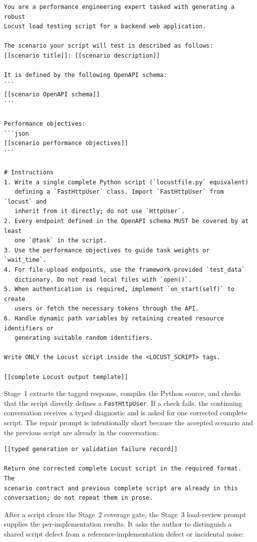 \small
\begin{verbatim}
You are a performance engineering expert tasked with generating a robust
Locust load testing script for a backend web application.

The scenario your script will test is described as follows:
[[scenario title]]: [[scenario description]]

It is defined by the following OpenAPI schema:
```
[[scenario OpenAPI schema]]
```

Performance objectives:
```json
[[scenario performance objectives]]
```

# Instructions
1. Write a single complete Python script (`locustfile.py` equivalent)
   defining a `FastHttpUser` class. Import `FastHttpUser` from `locust` and
   inherit from it directly; do not use `HttpUser`.
2. Every endpoint defined in the OpenAPI schema MUST be covered by at least
   one `@task` in the script.
3. Use the performance objectives to guide task weights or `wait_time`.
4. For file-upload endpoints, use the framework-provided `test_data`
   dictionary. Do not read local files with `open()`.
5. When authentication is required, implement `on_start(self)` to create
   users or fetch the necessary tokens through the API.
6. Handle dynamic path variables by retaining created resource identifiers or
   generating suitable random identifiers.

Write ONLY the Locust script inside the <LOCUST_SCRIPT> tags.

[[complete Locust output template]]

\end{verbatim}
\normalsize

Stage~1 extracts the tagged response, compiles the Python source, and checks
that the script directly defines a \texttt{FastHttpUser}. If a check fails,
the continuing conversation receives a typed diagnostic and is asked for one
corrected complete script. The repair prompt is intentionally short because
the accepted scenario and the previous script are already in the conversation:

\small
\begin{verbatim}
[[typed generation or validation failure record]]

Return one corrected complete Locust script in the required format. The
scenario contract and previous complete script are already in this
conversation; do not repeat them in prose.
\end{verbatim}
\normalsize

After a script clears the Stage~2 coverage gate, the Stage~3 load-review
prompt supplies the per-implementation results. It asks the author to distinguish a
shared script defect from a reference-implementation defect or incidental
noise:

